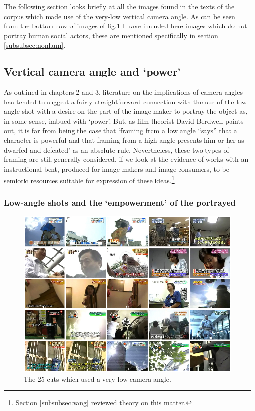 The following section looks briefly at all the images found in the texts of the corpus which made use of the very-low vertical camera angle. As can be seen from the bottom row of images of fig.\ref{fig:lowanglemontage} I have included here images which do not portray human social actors, these are mentioned specifically in section \ref{subsubsec:nonhum}.

\subsection{Vertical camera angle and `power'}
As outlined in chapters 2 and 3, literature on the implications of camera angles has tended to suggest a fairly straightforward connection with the use of the low-angle shot with a desire on the part of the image-maker to portray the object as, in some sense, imbued with `power'. But, as film theorist David Bordwell points out, it is far from being the case that `framing from a low angle ``says'' that a character is powerful and that framing from a high angle presents him or her as dwarfed and defeated' \citep[213]{Bordwell:1993} as an absolute rule. Nevertheless, these two types of framing are still generally considered, if we look at the evidence of works with an instructional bent, produced for image-makers and image-consumers, to be semiotic resources suitable for expression of these ideas.\footnote{Section \ref{subsubsec:vang} reviewed theory on this matter.} 

\subsubsection{Low-angle shots and the `empowerment' of the portrayed}

\begin{figure}[t] %
   \centering
   \includegraphics[width=14cm]{lowanglemontage.jpg} 
   \caption[Very low-angle images]{The 25 cuts which used a very low camera angle.}
   \label{fig:lowanglemontage}
\end{figure}

